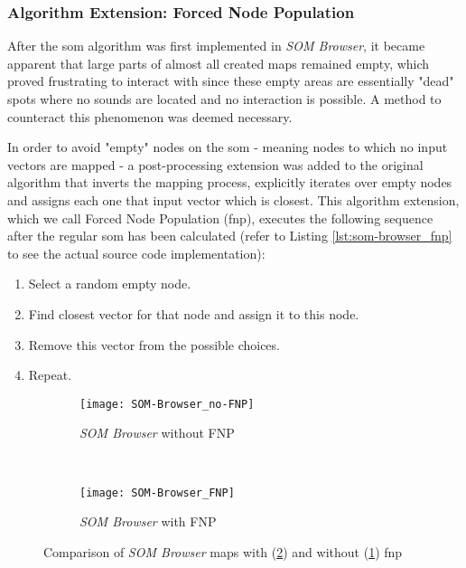 \subsubsection{Algorithm Extension: Forced Node Population}
\label{subsubsec:som_forced_population}

After the \gls{som} algorithm was first implemented in \textit{SOM Browser}, it
became apparent that large parts of almost all created maps remained empty,
which proved frustrating to interact with since these empty areas are
essentially "dead" spots where no sounds are located and no interaction is
possible. A method to counteract this phenomenon was deemed necessary.

\smallskip

%

In order to avoid "empty" nodes on the \gls{som} - meaning nodes to which no
input vectors are mapped - a post-processing extension was added to the original
algorithm that inverts the mapping process, explicitly iterates over empty nodes
and assigns each one that input vector which is closest. This algorithm
extension, which we call Forced Node Population (\gls{fnp}), executes the
following sequence after the regular \gls{som} has been calculated (refer to
Listing \ref{lst:som-browser_fnp} to see the actual source code implementation):


\begin{enumerate}
  \item Select a random empty node.
  \item Find closest vector for that node and assign it to this node.
  \item Remove this vector from the possible choices.
  \item Repeat.
\end{enumerate}

\begin{figure}[!htb]
  \centering
\begin{subfigure}{0.45\textwidth}
  \centering
  \texttt{[image: SOM-Browser\_no-FNP]}
  \caption{\textit{SOM Browser} without FNP}
  \label{fig:som-browser_no_fnp}
\end{subfigure}
~
\begin{subfigure}{0.45\textwidth}
  \centering
  \texttt{[image: SOM-Browser\_FNP]}
  \caption{\textit{SOM Browser} with FNP}
  \label{fig:som-browser_fnp}
\end{subfigure}
\caption[Comparison of maps with (\ref{fig:som-browser_fnp}) and without
(\ref{fig:som-browser_no_fnp}) \gls{fnp}]
{Comparison of \textit{SOM Browser} maps with (\ref{fig:som-browser_fnp}) and
without (\ref{fig:som-browser_no_fnp}) \gls{fnp}}
\label{fig:som-browser_fnp_comparison}
\end{figure}

